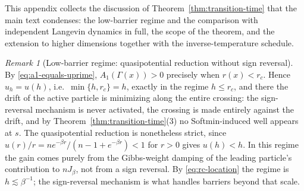 \documentclass{article} %
\theoremstyle{plain}
\theoremstyle{definition}
\theoremstyle{remark}
\newtheorem{remark}[theorem]{Remark}
\newcommand{\prefactor}[2]{A_{#1}(#2)}
\begin{document}
This appendix collects the discussion of Theorem~\ref{thm:transition-time} that the main text condenses: the low-barrier regime and the comparison with independent Langevin dynamics in full, the scope of the theorem, and the extension to higher dimensions together with the inverse-temperature schedule.

\begin{remark}[Low-barrier regime: quasipotential reduction without sign reversal]
\label{rem:low-barrier}
By \eqref{eq:a1-equals-uprime}, $\prefactor{1}{\Gamma(x)}>0$ precisely when $r(x)<r_c$. Hence $u_h=u(h)$, i.e.\ $\min\{h,r_c\}=h$, exactly in the regime $h\le r_c$, and there the drift of the active particle is minimizing along the entire crossing: the sign-reversal mechanism is never activated, the crossing is made entirely against the drift, and by Theorem~\ref{thm:transition-time}(3) no Softmin-induced well appears at $s$. The quasipotential reduction is nonetheless strict, since $u(r)/r=ne^{-\beta r}/(n-1+e^{-\beta r})<1$ for $r>0$ gives $u(h)<h$. In this regime the gain comes purely from the Gibbs-weight damping of the leading particle's contribution to $nJ_\beta$, not from a sign reversal. By \eqref{eq:rc-location} the regime is $h\lesssim\beta^{-1}$; the sign-reversal mechanism is what handles barriers beyond that scale.
\end{remark}
\end{document}
